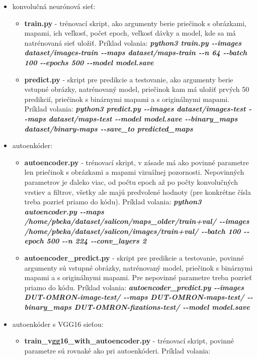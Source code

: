\begin{itemize}
	\item konvolučná neurónová sieť:
		\begin{itemize}
			\item \textbf{train.py} - trénovací skript, ako argumenty berie priečinok s obrázkami, mapami, ich veľkosť, počet epoch, veľkosť dávky a model, kde sa má natrénovaná sieť uložiť. Príklad volania: \textbf{\textit{python3 train.py -{}-images dataset/images-train -{}-maps dataset/maps-train -{}-n 64 -{}-batch 100 -{}-epochs 500 -{}-model model.save}}
			\item \textbf{predict.py} - skript pre predikcie a testovanie, ako argumenty berie vstupné obrázky, natrénovaný model, priečinok kam má uložiť prvých 50 predikcií, priečinok s binárnymi mapami a s originálnymi mapami. Príklad volania: \textbf{\textit{python3 predict.py -{}-images dataset/images-test -{}-maps dataset/maps-test -{}-model model.save -{}-binary\_maps dataset/binary-maps -{}-save\_to predicted\_maps}}
		\end{itemize}
	\item autoenkóder:
		\begin{itemize}
			\item \textbf{autoencoder.py} - trénovací skript, v zásade má ako povinné parametre len priečinok s obrázkami a mapami vizuálnej pozornosti. Nepovinných parametrov je ďaleko viac, od počtu epoch až po počty konvolučných vrstiev a filtrov, všetky ale majú predvolené hodnoty (pre konkrétne čísla treba pozrieť priamo do kódu). Príklad volania: \textbf{\textit{python3 autoencoder.py -{}-maps /home/pbeka/dataset/salicon/maps\_older/train+val/ -{}-images /home/pbeka/dataset/salicon/images/train+val/ -{}-batch 100 -{}-epoch 500 -{}-n 224 -{}-conv\_layers 2}}
			\item \textbf{autoencoder\_predict.py} - skript pre predikcie a testovanie, povinné argumenty sú vstupné obrázky, natrénovaný model, priečinok s binárnymi mapami a s originálnymi mapami. Pre nepovinné parametre treba pozrieť priamo do kódu. Príklad volania: \textbf{\textit{autoencoder\_predict.py -{}-images DUT-OMRON-image-test/  -{}-maps DUT-OMRON-maps-test/ -{}-binary\_maps DUT-OMRON-fixations-test/ -{}-model model.save}}
		\end{itemize}
	\item autoenkóder s VGG16 sieťou:
		\begin{itemize}
			\item \textbf{train\_vgg16\_with\_autoencoder.py} - trénovací skript, povinné parametre sú rovnaké ako pri autoenkóderi. Príklad volania: 

\end{itemize}
\end{itemize}
